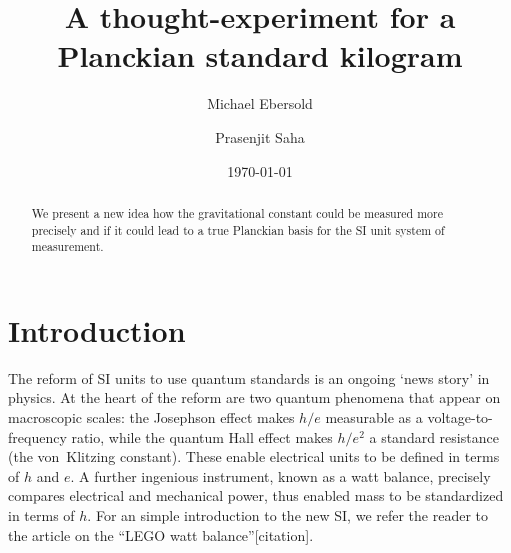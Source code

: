 \documentclass[prb,preprint]{revtex4-1}
\begin{document}

\title{A thought-experiment for a Planckian standard kilogram}

\author{Michael Ebersold}
\author{Prasenjit Saha}


\date{\today}

\begin{abstract}
We present a new idea how the gravitational constant could be measured more precisely and if it could lead to a true Planckian basis for the SI unit system of measurement.
\end{abstract}

\maketitle %


\section{Introduction}

The reform of SI units to use quantum standards is an ongoing `news
story' in physics.  At the heart of the reform are two quantum
phenomena that appear on macroscopic scales: the Josephson effect
makes $h/e$ measurable as a voltage-to-frequency ratio, while the
quantum Hall effect makes $h/e^2$ a standard resistance (the
von~Klitzing constant).  These enable electrical units to be defined
in terms of $h$ and $e$.  A further ingenious instrument, known as a
watt balance, precisely compares electrical and mechanical power, thus
enabled mass to be standardized in terms of $h$.  For an simple
introduction to the new SI, we refer the reader to the article on the
``LEGO watt balance''[citation].
\end{document}
